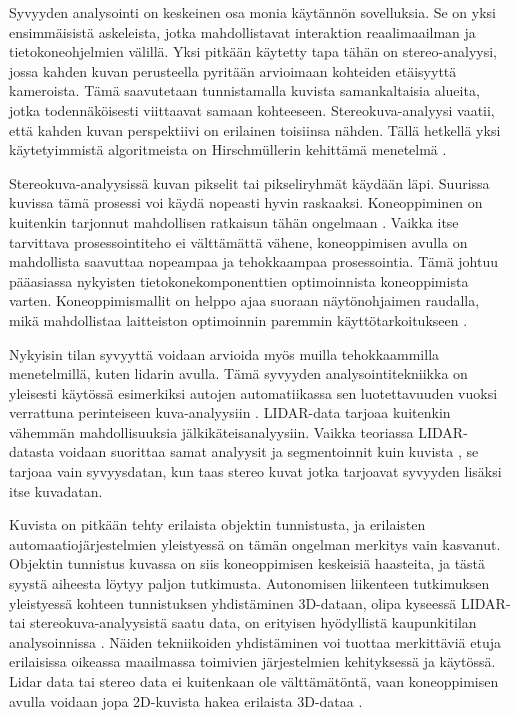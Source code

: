 Syvyyden analysointi on keskeinen osa monia käytännön sovelluksia.
Se on yksi ensimmäisistä askeleista, jotka mahdollistavat interaktion reaalimaailman ja tietokoneohjelmien välillä.
Yksi pitkään käytetty tapa tähän on stereo-analyysi,
jossa kahden kuvan perusteella pyritään arvioimaan kohteiden etäisyyttä kameroista.
Tämä saavutetaan tunnistamalla kuvista samankaltaisia alueita, jotka todennäköisesti viittaavat samaan kohteeseen.
Stereokuva-analyysi vaatii, että kahden kuvan perspektiivi on erilainen toisiinsa nähden.
Tällä hetkellä yksi käytetyimmistä algoritmeista on Hirschmüllerin kehittämä menetelmä \cite{hirschmuller2005babel}.

Stereokuva-analyysissä kuvan pikselit tai pikseliryhmät käydään läpi.
Suurissa kuvissa tämä prosessi voi käydä nopeasti hyvin raskaaksi.
Koneoppiminen on kuitenkin tarjonnut mahdollisen ratkaisun tähän ongelmaan \cite{LagaHamid2022ASoD}.
Vaikka itse tarvittava prosessointiteho ei välttämättä vähene, koneoppimisen avulla on mahdollista saavuttaa nopeampaa ja tehokkaampaa prosessointia.
Tämä johtuu pääasiassa nykyisten tietokonekomponenttien optimoinnista koneoppimista varten.
Koneoppimismallit on helppo ajaa suoraan näytönohjaimen raudalla, mikä mahdollistaa laitteiston optimoinnin paremmin käyttötarkoitukseen \cite{LeeVictorW2010Dt1G}.

Nykyisin tilan syvyyttä voidaan arvioida myös muilla tehokkaammilla menetelmillä, kuten lidarin avulla.
Tämä syvyyden analysointitekniikka on yleisesti käytössä esimerkiksi autojen automatiikassa sen luotettavuuden vuoksi verrattuna perinteiseen kuva-analyysiin \cite{RorizRicardo2022ALTA}.
LIDAR-data tarjoaa kuitenkin vähemmän mahdollisuuksia jälkikäteisanalyysiin.
Vaikka teoriassa LIDAR-datasta voidaan suorittaa samat analyysit ja segmentoinnit kuin kuvista \cite{SunJiaming2020DRS3}, se tarjoaa vain syvyysdatan, kun taas stereo kuvat jotka tarjoavat syvyyden lisäksi itse kuvadatan.

Kuvista on pitkään tehty erilaista objektin tunnistusta, ja erilaisten automaatiojärjestelmien yleistyessä on tämän ongelman merkitys vain kasvanut.
Objektin tunnistus kuvassa on siis koneoppimisen keskeisiä haasteita, ja tästä syystä aiheesta löytyy paljon tutkimusta.
Autonomisen liikenteen tutkimuksen yleistyessä kohteen tunnistuksen yhdistäminen 3D-dataan, olipa kyseessä LIDAR- tai stereokuva-analyysistä saatu data, on erityisen hyödyllistä kaupunkitilan analysoinnissa \cite{MengZeYu2024TODf}. Näiden tekniikoiden yhdistäminen voi tuottaa merkittäviä etuja erilaisissa oikeassa maailmassa toimivien järjestelmien kehityksessä ja käytössä.
Lidar data tai stereo data ei kuitenkaan ole välttämätöntä, vaan koneoppimisen avulla voidaan jopa 2D-kuvista hakea erilaista 3D-dataa \cite{MaXinzhu20243ODF}.


